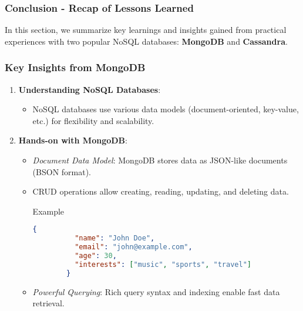 \documentclass[aspectratio=169]{beamer}
\begin{document}
\begin{frame}[fragile]
  \frametitle{Conclusion - Recap of Lessons Learned}
  In this section, we summarize key learnings and insights gained from practical experiences with two popular NoSQL databases: 
  \textbf{MongoDB} and \textbf{Cassandra}.
\end{frame}

\begin{frame}[fragile]
  \frametitle{Key Insights from MongoDB}
  \begin{enumerate}
    \item \textbf{Understanding NoSQL Databases}:
      \begin{itemize}
        \item NoSQL databases use various data models (document-oriented, key-value, etc.) for flexibility and scalability.
      \end{itemize}
      
    \item \textbf{Hands-on with MongoDB}:
      \begin{itemize}
        \item \textit{Document Data Model}: MongoDB stores data as JSON-like documents (BSON format).
        \item CRUD operations allow creating, reading, updating, and deleting data.
        
        \begin{block}{Example}
        \begin{lstlisting}[language=json]
        {
          "name": "John Doe",
          "email": "john@example.com",
          "age": 30,
          "interests": ["music", "sports", "travel"]
        }
        \end{lstlisting}
        \end{block}
        
        \item \textit{Powerful Querying}: Rich query syntax and indexing enable fast data retrieval.
      \end{itemize}
  \end{enumerate}
\end{frame}
\end{document}
